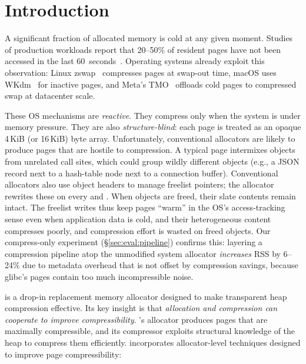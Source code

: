 \section{Introduction}
\label{sec:intro}

A significant fraction of allocated memory is cold at any given
moment.  Studies of production workloads report that
20--50\% of resident pages have not been accessed in the last
60~seconds~\cite{maas2020adaptive,amaro2023memory}.
Operating systems already exploit this observation: Linux
zswap~\cite{jennings2013zswap} compresses pages at swap-out time,
macOS uses WKdm~\cite{wilson1999case,apple2013compressed} for
inactive pages, and Meta's TMO~\cite{weiner2022tmo} offloads cold
pages to compressed swap at datacenter scale.

These OS mechanisms are \emph{reactive}. They compress only when
the system is under memory pressure. They are also \emph{structure-blind}:
each page is treated as an opaque 4\,KiB (or 16\,KiB) byte array.
Unfortunately, conventional allocators are likely to produce pages that are
hostile to compression.  A typical page intermixes objects from
unrelated call sites, which could group wildly different objects (e.g., a JSON record next to a hash-table node next to a connection buffer). Conventional allocators also use object headers to manage freelist pointers; the allocator
rewrites these on every  and . When objects are freed, their
slate contents remain intact. The freelist writes thus keep pages ``warm'' in the
OS's access-tracking sense even when application data is cold, and
their heterogeneous content compresses poorly, and compression effort is wasted on freed objects.
Our compress-only experiment (\S\ref{sec:eval:pipeline}) confirms
this: layering a compression pipeline atop the unmodified system
allocator \emph{increases} RSS by 6--24\% due to metadata overhead
that is not offset by compression savings, because glibc's pages
contain too much incompressible noise.

\sys is a drop-in replacement memory allocator designed to make
transparent heap compression effective.  Its key insight is that
\emph{allocation and compression can cooperate to improve
compressibility}. \sys's allocator produces pages that are maximally
compressible, and its compressor exploits structural knowledge of the
heap to compress them efficiently.  \sys incorporates allocator-level
techniques designed to improve page compressibility:

